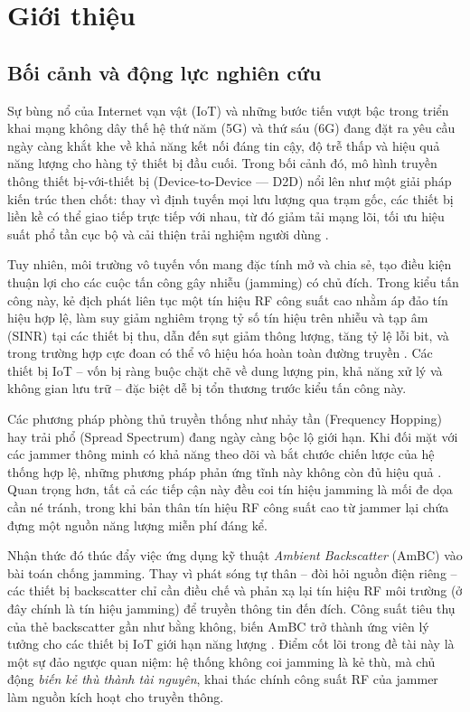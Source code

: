 \chapter{Giới thiệu}
\label{chap:intro}

\section{Bối cảnh và động lực nghiên cứu}
\label{sec:intro:motivation}

Sự bùng nổ của Internet vạn vật (IoT) và những bước tiến vượt bậc trong triển khai mạng
không dây thế hệ thứ năm (5G) và thứ sáu (6G) đang đặt ra yêu cầu ngày càng khắt khe về
khả năng kết nối đáng tin cậy, độ trễ thấp và hiệu quả năng lượng cho hàng tỷ thiết bị
đầu cuối. Trong bối cảnh đó, mô hình truyền thông thiết bị-với-thiết bị (Device-to-Device
--- D2D) nổi lên như một giải pháp kiến trúc then chốt: thay vì định tuyến mọi lưu lượng
qua trạm gốc, các thiết bị liền kề có thể giao tiếp trực tiếp với nhau, từ đó giảm tải
mạng lõi, tối ưu hiệu suất phổ tần cục bộ và cải thiện trải nghiệm người dùng
\cite{gu2023uav}.

Tuy nhiên, môi trường vô tuyến vốn mang đặc tính mở và chia sẻ, tạo điều kiện thuận lợi
cho các cuộc tấn công gây nhiễu (jamming) có chủ đích. Trong kiểu tấn công này, kẻ địch
phát liên tục một tín hiệu RF công suất cao nhằm áp đảo tín hiệu hợp lệ, làm suy giảm
nghiêm trọng tỷ số tín hiệu trên nhiễu và tạp âm (SINR) tại các thiết bị thu, dẫn đến
sụt giảm thông lượng, tăng tỷ lệ lỗi bit, và trong trường hợp cực đoan có thể vô hiệu hóa
hoàn toàn đường truyền \cite{pelechrinis2011dos}. Các thiết bị IoT -- vốn bị ràng buộc
chặt chẽ về dung lượng pin, khả năng xử lý và không gian lưu trữ -- đặc biệt dễ bị tổn
thương trước kiểu tấn công này.

Các phương pháp phòng thủ truyền thống như nhảy tần (Frequency Hopping) hay trải phổ
(Spread Spectrum) đang ngày càng bộc lộ giới hạn. Khi đối mặt với các jammer thông minh
có khả năng theo dõi và bắt chước chiến lược của hệ thống hợp lệ, những phương pháp phản
ứng tĩnh này không còn đủ hiệu quả \cite{grover2014jamming}. Quan trọng hơn, tất cả các
tiếp cận này đều coi tín hiệu jamming là mối đe dọa cần né tránh, trong khi bản thân tín
hiệu RF công suất cao từ jammer lại chứa đựng một nguồn năng lượng miễn phí đáng kể.

Nhận thức đó thúc đẩy việc ứng dụng kỹ thuật \emph{Ambient Backscatter} (AmBC) vào bài
toán chống jamming. Thay vì phát sóng tự thân -- đòi hỏi nguồn điện riêng -- các thiết bị
backscatter chỉ cần điều chế và phản xạ lại tín hiệu RF môi trường (ở đây chính là tín
hiệu jamming) để truyền thông tin đến đích. Công suất tiêu thụ của thẻ backscatter gần như
bằng không, biến AmBC trở thành ứng viên lý tưởng cho các thiết bị IoT giới hạn năng lượng
\cite{huynh2019jam}. Điểm cốt lõi trong đề tài này là một sự đảo ngược quan niệm: hệ thống
không coi jamming là kẻ thù, mà chủ động \emph{biến kẻ thù thành tài nguyên}, khai thác
chính công suất RF của jammer làm nguồn kích hoạt cho truyền thông.

